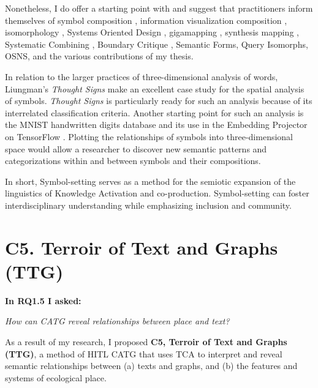 Nonetheless, I do offer a starting point with and suggest that practitioners inform themselves of symbol composition \citep{liungman_thought_1995}, information visualization composition \citep{vital_how_2018,ribecca_data_2017}, isomorphology \citep{anderson_drawing_2018}, Systems Oriented Design \citep[p. 343]{sevaldson_designing_2022}, gigamapping \citep{sevaldson_giga-mapping_2011} \citep[p. 26]{sevaldson_designing_2022}, synthesis mapping \citep{jones_synthesis_2016} 
\citep[p. 129]{jones_synthesis_2017}, Systematic Combining \citep[p. 554]{dubois_systematic_2002} 
\citep{ kjode_entanglement_2024}, Boundary Critique \citep{midgley_theory_1998}, Semantic Forms, Query Isomorphs, OSNS, and the various contributions of my thesis. 


In relation to the larger practices of three-dimensional analysis of words, Liungman’s \textit{Thought Signs} \citep{liungman_thought_1995} make an excellent case study for the spatial analysis of symbols. \textit{Thought Signs} is particularly ready for such an analysis because of its interrelated classification criteria. Another starting point for such an analysis is the MNIST handwritten digits database \citep{lecun_mnist_2012} and its use in the Embedding Projector on TensorFlow \citep{smilkov_embedding_2016}. Plotting the relationships of symbols into three-dimensional space would allow a researcher to discover new semantic patterns and categorizations within and between symbols and their compositions.  

In short, Symbol-setting serves as a method for the semiotic expansion of the linguistics of Knowledge Activation and co-production. Symbol-setting can foster interdisciplinary understanding while emphasizing inclusion and community.
\section{C5. Terroir of Text and Graphs (TTG) }

\noindent\textbf{In RQ1.5 I asked:}

\textit{How can CATG reveal relationships between place and text?}

As a result of my research, I proposed \textbf{C5, Terroir of Text and Graphs (TTG)}, a method of HITL CATG that uses TCA to interpret and reveal semantic relationships between (a) texts and graphs, and (b) the features and systems of ecological place.

